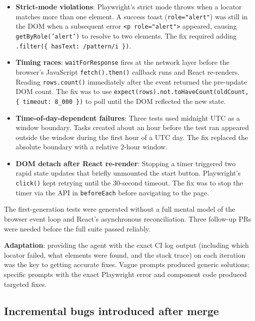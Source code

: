 \documentclass[a4paper, 12pt]{article}
\begin{document}
\begin{itemize}
  \item \textbf{Strict-mode violations}: Playwright's strict mode throws when a locator
        matches more than one element. A success toast (\texttt{role="alert"}) was still in
        the DOM when a subsequent error \texttt{<p role="alert">} appeared, causing
        \texttt{getByRole('alert')} to resolve to two elements. The fix required adding
        \texttt{.filter(\{ hasText: /pattern/i \})}.

  \item \textbf{Timing races}: \texttt{waitForResponse} fires at the network layer before
        the browser's JavaScript \texttt{fetch().then()} callback runs and React re-renders.
        Reading \texttt{rows.count()} immediately after the event returned the pre-update
        DOM count. The fix was to use \texttt{expect(rows).not.toHaveCount(oldCount, \{
        timeout: 8\_000 \})} to poll until the DOM reflected the new state.

  \item \textbf{Time-of-day-dependent failures}: Three tests used midnight UTC as a window
        boundary. Tasks created about an hour before the test ran appeared outside the window
        during the first hour of a UTC day. The fix replaced the absolute boundary with a
        relative 2-hour window.

  \item \textbf{DOM detach after React re-render}: Stopping a timer triggered two rapid
        state updates that briefly unmounted the start button. Playwright's \texttt{click()}
        kept retrying until the 30-second timeout. The fix was to stop the timer via the API
        in \texttt{beforeEach} before navigating to the page.
\end{itemize}

The first-generation tests were generated without a full mental model of the browser event
loop and React's asynchronous reconciliation. Three follow-up PRs were needed before the
full suite passed reliably.

\textbf{Adaptation}: providing the agent with the exact CI log output (including which
locator failed, what elements were found, and the stack trace) on each iteration was the key
to getting accurate fixes. Vague prompts produced generic solutions; specific prompts with
the exact Playwright error and component code produced targeted fixes.

\subsection{Incremental bugs introduced after merge}
\end{document}
